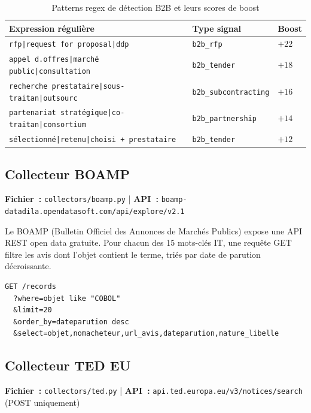 \begin{table}[H]
  \centering
  \begin{tabular}{L{5.5cm} L{3.5cm} C{1.5cm}}
    \toprule
    \textbf{Expression régulière} & \textbf{Type signal} & \textbf{Boost} \\
    \midrule
    \texttt{rfp|request for proposal|ddp} & \texttt{b2b\_rfp} & $+22$ \\
    \texttt{appel d.offres|marché public|consultation} & \texttt{b2b\_tender} & $+18$ \\
    \texttt{recherche prestataire|sous-traitan|outsourc} & \texttt{b2b\_subcontracting} & $+16$ \\
    \texttt{partenariat stratégique|co-traitan|consortium} & \texttt{b2b\_partnership} & $+14$ \\
    \texttt{sélectionné|retenu|choisi + prestataire} & \texttt{b2b\_tender} & $+12$ \\
    \bottomrule
  \end{tabular}
  \caption{Patterns regex de détection B2B et leurs scores de boost}
  \label{tab:b2b_patterns}
\end{table}

\subsection{Collecteur BOAMP}

\textbf{Fichier~:} \texttt{collectors/boamp.py} |
\textbf{API~:} \texttt{boamp-datadila.opendatasoft.com/api/explore/v2.1}

Le BOAMP (Bulletin Officiel des Annonces de Marchés Publics) expose une API REST
open data gratuite. Pour chacun des 15 mots-clés IT, une requête GET filtre les
avis dont l'objet contient le terme, triés par date de parution décroissante.

\begin{lstlisting}[language=Python3, caption={Requête BOAMP (extrait)}, label=lst:boamp]
GET /records
  ?where=objet like "COBOL"
  &limit=20
  &order_by=dateparution desc
  &select=objet,nomacheteur,url_avis,dateparution,nature_libelle
\end{lstlisting}

\subsection{Collecteur TED EU}

\textbf{Fichier~:} \texttt{collectors/ted.py} |
\textbf{API~:} \texttt{api.ted.europa.eu/v3/notices/search} (POST uniquement)

